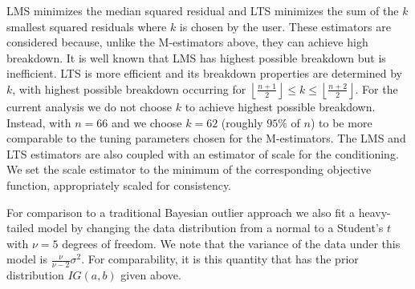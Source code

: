 \documentclass[12pt]{article}
\newcommand{\green}[1]{{\color{green}#1}}
\begin{document}
LMS minimizes the median squared residual and LTS minimizes the sum of the $k$ smallest squared residuals where $k$ is chosen by the user. These estimators are considered because, unlike the M-estimators above, they can achieve high breakdown.
It is well known that LMS has highest possible breakdown but is inefficient. LTS is more efficient and its breakdown properties are determined by $k$, with highest possible breakdown occurring for $\left \lfloor{\frac{n+1}{2}}\right \rfloor\leq k\leq\left \lfloor{\frac{n+2}{2}}\right \rfloor$. %
For the current analysis we do not choose $k$ to achieve highest possible breakdown. Instead, with $n=66$ and we choose $k=62$ (roughly $95\%$ of $n$) to be \green{more} %
comparable to the tuning parameters chosen for the M-estimators. The LMS and LTS \green{estimators} are also coupled with an estimator of scale for the conditioning. We set the scale estimator to the minimum of the corresponding objective function, appropriately scaled for consistency. %

For comparison to a traditional Bayesian outlier approach we also fit a heavy-tailed model by changing the data distribution from a normal to a Student's $t$ with $\nu=5$ degrees of freedom. We note that the variance of the data under this model is $\frac{\nu}{\nu-2}\sigma^{2}$.  For comparability, it is this quantity that has the prior distribution $IG(a,b)$ given above.   
\end{document}
